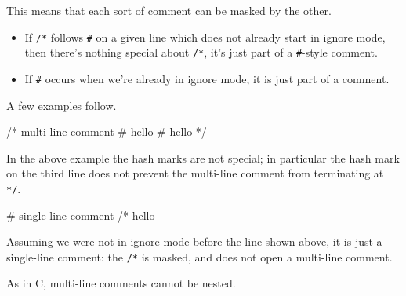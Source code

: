 This means that each sort of comment can be masked by the other.  

\begin{itemize}
\item If \texttt{/*} follows \texttt{\#} on a given line which does
  not already start in ignore mode, then there's nothing special about
  \texttt{/*}, it's just part of a \texttt{\#}-style comment.
\item If \texttt{\#} occurs when we're already in ignore mode, it is
  just part of a comment.
\end{itemize}

A few examples follow.
%
\begin{code}
/* multi-line comment
   # hello
   # hello */
\end{code}
%
In the above example the hash marks are not special; in particular
the hash mark on the third line does not prevent the multi-line
comment from terminating at \texttt{*/}.
%
\begin{code}
# single-line comment /* hello
\end{code}
%
Assuming we were not in ignore mode before the line shown above, it is
just a single-line comment: the \texttt{/*} is masked, and does not
open a multi-line comment.

As in C, multi-line comments cannot be nested.






